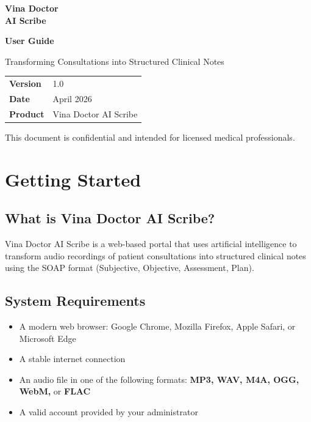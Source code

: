 \documentclass[12pt,a4paper]{article}
\begin{document}
\begin{titlepage}
	\centering
	\vspace*{2cm}

	\color{primary}\LARGE\bfseries Vina Doctor \\[0.3em]
	\color{primary-container}\large AI Scribe

	\vspace{1.5cm}

	{\color{primary}\Huge\bfseries User Guide}

	\vspace{1cm}
	{\color{secondary}\Large Transforming Consultations into Structured Clinical Notes}

	\vspace{3cm}

	\begin{tabular}{m{2.5cm}m{10cm}}
		\textbf{Version} & 1.0                   \\
		\textbf{Date}    & April 2026            \\
		\textbf{Product} & Vina Doctor AI Scribe \\
	\end{tabular}

	\vspace{2cm}
	\color{secondary}\small This document is confidential and intended for licensed medical professionals.
\end{titlepage}

\newpage
\tableofcontents
\newpage

\section{Getting Started}

\subsection{What is Vina Doctor AI Scribe?}
Vina Doctor AI Scribe is a web-based portal that uses artificial intelligence to
transform audio recordings of patient consultations into structured clinical notes
using the SOAP format (Subjective, Objective, Assessment, Plan).

\subsection{System Requirements}
\begin{itemize}
	\item A modern web browser: Google Chrome, Mozilla Firefox, Apple Safari, or Microsoft Edge
	\item A stable internet connection
	\item An audio file in one of the following formats: \textbf{MP3, WAV, M4A, OGG, WebM,} or \textbf{FLAC}
	\item A valid account provided by your administrator
\end{itemize}
\end{document}
